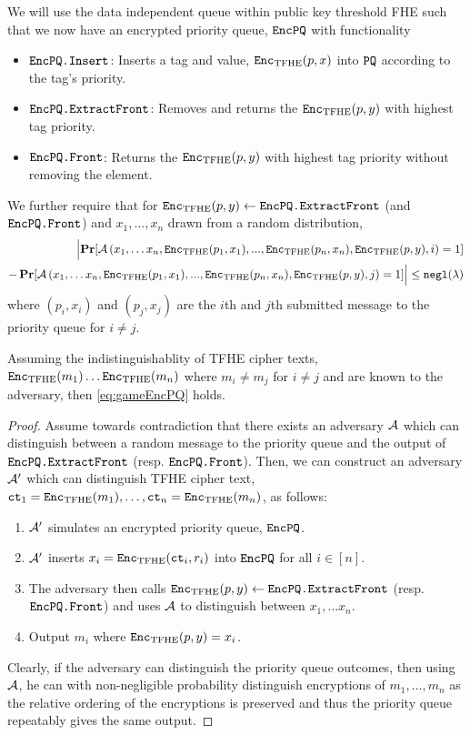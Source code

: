 We will use the data independent queue within public key threshold FHE such that we now have an encrypted priority queue, $\texttt{EncPQ}$
with functionality
\begin{itemize}
	\item $\texttt{EncPQ.Insert}$: Inserts a tag and value, $\texttt{Enc}_{\mathrm{TFHE}}(p, x)$ into $\texttt{PQ}$ according to the tag's priority.
	\item $\texttt{EncPQ.ExtractFront}$: Removes and returns the $\texttt{Enc}_{\mathrm{TFHE}}(p, y)$ with highest tag priority.
	\item $\texttt{EncPQ.Front}$: Returns the $\texttt{Enc}_{\mathrm{TFHE}}(p, y)$ with highest tag priority without removing the element.
\end{itemize}

We further require that for $\texttt{Enc}_{\mathrm{TFHE}}(p, y) \gets \texttt{EncPQ.ExtractFront}$ (and $\texttt{EncPQ.Front}$) and $x_1, ..., x_n$ drawn from a random distribution,
\begin{align}
	\label{eq:gameEncPQ}
	\Bigl\lvert \operatorname*{\mathbf{Pr}}[\mathcal{A}\left(x_1, \dots x_n, \texttt{Enc}_{\mathrm{TFHE}}(p_1, x_1), ..., \texttt{Enc}_{\mathrm{TFHE}}(p_n, x_n), \texttt{Enc}_{\mathrm{TFHE}}(p, y), i\right) = 1] \\
	 	 - \operatorname*{\mathbf{Pr}}[\mathcal{A}\left(x_1, \dots x_n, \texttt{Enc}_{\mathrm{TFHE}}(p_1, x_1), ..., \texttt{Enc}_{\mathrm{TFHE}}(p_n, x_n), \texttt{Enc}_{\mathrm{TFHE}}(p, y), j\right) = 1]
		 \Bigr\rvert \leq \texttt{negl}(\lambda) \notag
\end{align}
where $(p_i, x_i)$ and $(p_j, x_j)$ are the $i$th and $j$th submitted message to the priority queue for $i \neq j$.

\begin{lemma}
	Assuming the indistinguishablity of TFHE cipher texts, $\texttt{Enc}_{\mathrm{TFHE}}(m_1) \dots \texttt{Enc}_{\mathrm{TFHE}}(m_n)$
	where $m_i \neq m_j$ for $i \neq j$ and are known to the adversary, then \cref{eq:gameEncPQ} holds.

	\begin{proof}
		Assume towards contradiction that there exists an adversary $\mathcal{A}$ which can distinguish between a random 
		message to the priority queue and the output of $\texttt{EncPQ.ExtractFront}$ (resp. $\texttt{EncPQ.Front}$).
		Then, we can construct an adversary $\mathcal{A}'$ which can distinguish TFHE cipher text, $\texttt{ct}_1 = \texttt{Enc}_{\mathrm{TFHE}}(m_1), \dots, \texttt{ct}_n = \texttt{Enc}_{\mathrm{TFHE}}(m_n)$, as follows:
		\begin{enumerate}
			\item $\mathcal{A}'$ simulates an encrypted priority queue, $\texttt{EncPQ}$.
			\item $\mathcal{A}'$ inserts $x_i = \texttt{Enc}_{\mathrm{TFHE}}(\texttt{ct}_i, r_i)$ into $\texttt{EncPQ}$ for all $i \in [n]$.
			\item The adversary then calls $\texttt{Enc}_{\mathrm{TFHE}}(p, y) \gets \texttt{EncPQ.ExtractFront}$ (resp. $\texttt{EncPQ.Front}$) and uses $\mathcal{A}$ to distinguish between $x_1, \dots x_n$.
			\item Output $m_i$ where $\texttt{Enc}_{\mathrm{TFHE}}(p, y) = x_i$.
		\end{enumerate}
		Clearly, if the adversary can distinguish the priority queue outcomes, then using $\mathcal{A}$, he can with non-negligible probability
		distinguish encryptions of $m_1, \dots, m_n$ as the relative ordering of the encryptions is preserved and thus the priority queue repeatably gives the same output.
	\end{proof}
\end{lemma}


